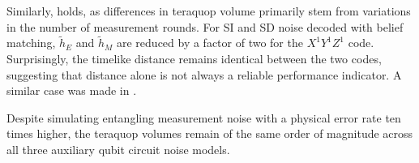 Similarly,  holds, as differences in teraquop volume primarily stem from variations in the number of measurement rounds.
For SI and SD noise decoded with belief matching, $\tilde{h}_E$ and $\tilde{h}_M$ are reduced by a factor of two for the $X^1Y^1Z^1$ code.
Surprisingly, the timelike distance remains identical between the two codes, suggesting that distance alone is not always a reliable performance indicator.
A similar case was made in .

Despite simulating entangling measurement noise with a physical error rate ten times higher, the teraquop volumes remain of the same order of magnitude across all three auxiliary qubit circuit noise models.
